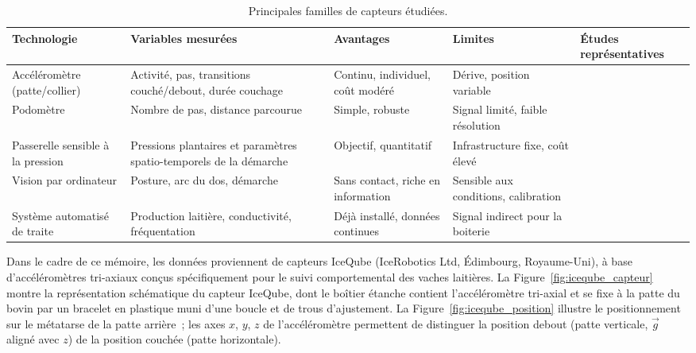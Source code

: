 \begin{table}[H]
    \centering
    \small
    \caption{Principales familles de capteurs étudiées.}
    \label{tab:technologies_capteurs}
    \begin{tabular}{>{\raggedright\arraybackslash}p{2.8cm}
                    >{\raggedright\arraybackslash}p{3.2cm}
                    >{\raggedright\arraybackslash}p{3.2cm}
                    >{\raggedright\arraybackslash}p{2.6cm}
                    >{\raggedright\arraybackslash}p{2.6cm}}
        \toprule
        \textbf{Technologie} & \textbf{Variables mesurées} & \textbf{Avantages} &
        \textbf{Limites} & \textbf{Études représentatives} \\
        \midrule
        Accéléromètre (patte/collier)
        & Activité, pas, transitions couché/debout, durée couchage
        & Continu, individuel, coût modéré
        & Dérive, position variable
        & \citep{alsaaod2012electronic,balasso2023behaviour} \\
        \addlinespace
        Podomètre
        & Nombre de pas, distance parcourue
        & Simple, robuste
        & Signal limité, faible résolution
        & \citep{flower2006effect,mazrier2006reliability} \\
        \addlinespace
        Passerelle sensible à la pression
        & Pressions plantaires et paramètres spatio-temporels de la démarche
        & Objectif, quantitatif
        & Infrastructure fixe, coût élevé
        & \citep{maertens2011gaitwise} \\
        \addlinespace
        Vision par ordinateur
        & Posture, arc du dos, démarche
        & Sans contact, riche en information
        & Sensible aux conditions, calibration
        & \citep{qiao2021review} \\
        \addlinespace
        Système automatisé de traite
        & Production laitière, conductivité, fréquentation
        & Déjà installé, données continues
        & Signal indirect pour la boiterie
        & \citep{lavrova2023lameness,vanhertem2013lameness} \\
        \bottomrule
    \end{tabular}
\end{table}

Dans le cadre de ce mémoire, les données proviennent de capteurs IceQube
(IceRobotics Ltd, Édimbourg, Royaume-Uni), à base d'accéléromètres tri-axiaux conçus
spécifiquement pour le suivi comportemental des vaches laitières. La
Figure~\ref{fig:iceqube_capteur} montre la représentation schématique du capteur IceQube,
dont le boîtier étanche contient l'accéléromètre tri-axial et se fixe à la patte du bovin par un
bracelet en plastique muni d'une boucle et de trous d'ajustement. La
Figure~\ref{fig:iceqube_position} illustre le positionnement sur le métatarse de la patte
arrière~; les axes $x$, $y$, $z$ de l'accéléromètre permettent de distinguer la position
debout (patte verticale, $\vec{g}$ aligné avec $z$) de la position couchée (patte
horizontale).

